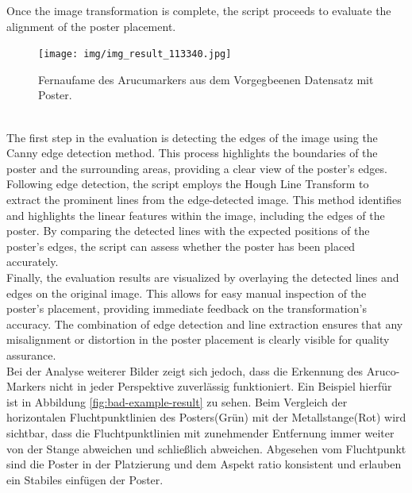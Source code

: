 \documentclass[a4paper,twocolumn]{article}
\begin{document}
Once the image transformation is complete, the script proceeds to evaluate the alignment of the poster placement.
\begin{figure}[h!]
    \centering
    \texttt{[image: img/img\_result\_113340.jpg]} %
    \caption{Fernaufame des Arucumarkers aus dem Vorgegbeenen Datensatz mit Poster.}
    \label{fig:example-result}
\end{figure}
 \\
 The first step in the evaluation is detecting the edges of the image using the Canny edge detection method. This process highlights the boundaries of the poster and the surrounding areas, providing a clear view of the poster's edges.
Following edge detection, the script employs the Hough Line Transform to extract the prominent lines from the edge-detected image. This method identifies and highlights the linear features within the image, including the edges of the poster. By comparing the detected lines with the expected positions of the poster's edges, the script can assess whether the poster has been placed accurately.
\\
Finally, the evaluation results are visualized by overlaying the detected lines and edges on the original image. This allows for easy manual inspection of the poster’s placement, providing immediate feedback on the transformation’s accuracy. The combination of edge detection and line extraction ensures that any misalignment or distortion in the poster placement is clearly visible for quality assurance.
\\
Bei der Analyse weiterer Bilder zeigt sich jedoch, dass die Erkennung des Aruco-Markers nicht in jeder Perspektive zuverlässig funktioniert. Ein Beispiel hierfür ist in Abbildung \ref{fig:bad-example-result} zu sehen. Beim Vergleich der horizontalen Fluchtpunktlinien des Posters(Grün) mit der Metallstange(Rot) wird sichtbar, dass die Fluchtpunktlinien mit zunehmender Entfernung immer weiter von der Stange abweichen und schließlich abweichen.
Abgesehen vom Fluchtpunkt sind die Poster in der Platzierung und dem Aspekt ratio konsistent und erlauben ein Stabiles einfügen der Poster.
\end{document}
